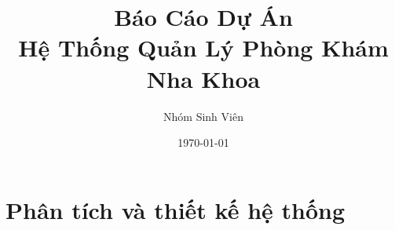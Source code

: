 \documentclass[12pt,a4paper]{article}
\title{Báo Cáo Dự Án\\Hệ Thống Quản Lý Phòng Khám Nha Khoa}
\author{Nhóm Sinh Viên}
\date{\today}
\begin{document}
\maketitle

\tableofcontents
\newpage

\section{Phân tích và thiết kế hệ thống}


\end{document}
